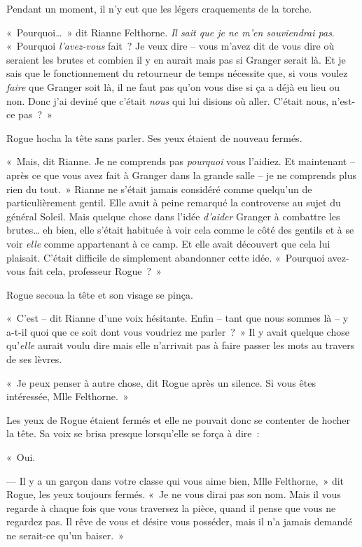 Pendant un moment, il n'y eut que les légers craquements de la torche.

«~Pourquoi…~» dit Rianne Felthorne. \emph{Il sait que je ne m'en souviendrai pas}. «~Pourquoi \emph{l'avez-vous} fait~? Je veux dire -- vous m'avez dit de vous dire où seraient les brutes et combien il y en aurait mais pas si Granger serait là. Et je sais que le fonctionnement du retourneur de temps nécessite que, si vous voulez \emph{faire} que Granger soit là, il ne faut pas qu'on vous dise si ça a déjà eu lieu ou non. Donc j'ai deviné que c'était \emph{nous} qui lui disions où aller. C'était nous, n'est-ce pas~?~»

Rogue hocha la tête sans parler. Ses yeux étaient de nouveau fermés.

«~Mais, dit Rianne. Je ne comprends pas \emph{pourquoi} vous l'aidiez. Et maintenant -- après ce que vous avez fait à Granger dans la grande salle -- je ne comprends plus rien du tout.~» Rianne ne s'était jamais considéré comme quelqu'un de particulièrement gentil. Elle avait à peine remarqué la controverse au sujet du général Soleil. Mais quelque chose dans l'idée \emph{d'aider} Granger à combattre les brutes… eh bien, elle s'était habituée à voir cela comme le côté des gentils et à se voir \emph{elle} comme appartenant à ce camp. Et elle avait découvert que cela lui plaisait. C'était difficile de simplement abandonner cette idée. «~Pourquoi avez-vous fait cela, professeur Rogue~?~»

Rogue secoua la tête et son visage se pinça.

«~C'est -- dit Rianne d'une voix hésitante. Enfin -- tant que nous sommes là -- y a-t-il quoi que ce soit dont vous voudriez me parler~?~» Il y avait quelque chose qu'\emph{elle} aurait voulu dire mais elle n'arrivait pas à faire passer les mots au travers de ses lèvres.

«~Je peux penser à autre chose, dit Rogue après un silence. Si vous êtes intéressée, Mlle Felthorne.~»

Les yeux de Rogue étaient fermés et elle ne pouvait donc se contenter de hocher la tête. Sa voix se brisa presque lorsqu'elle se força à dire~:

«~Oui.

--- Il y a un garçon dans votre classe qui vous aime bien, Mlle Felthorne,~» dit Rogue, les yeux toujours fermés. «~Je ne vous dirai pas son nom. Mais il vous regarde à chaque fois que vous traversez la pièce, quand il pense que vous ne regardez pas. Il rêve de vous et désire vous posséder, mais il n'a jamais demandé ne serait-ce qu'un baiser.~»

